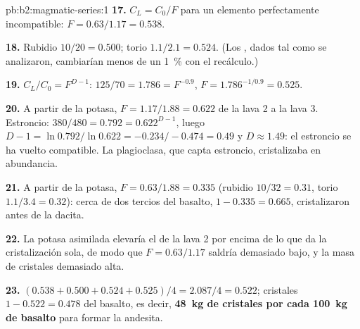 \begin{solution}{pb:b2:magmatic-series:1}
\textbf{17.} $C_L = C_0/F$ para un elemento perfectamente incompatible: $F = 0.63/1.17 =
0.538$.

\textbf{18.} Rubidio $10/20 = 0.500$; torio $1.1/2.1 = 0.524$. (Los ,
dados tal como se analizaron, cambiarían menos de un \qty{1}{\percent} con el
recálculo.)

\textbf{19.} $C_L/C_0 = F^{D - 1}$: $125/70 = 1.786 = F^{-0.9}$, $F = 1.786^{-1/0.9} =
0.525$.

\textbf{20.} A partir de la potasa, $F = 1.17/1.88 = 0.622$ de la lava 2 a la lava 3. Estroncio:
$380/480 = 0.792 = 0.622^{D - 1}$, luego $D - 1 = \ln 0.792/\ln 0.622 = -0.234/-0.474 =
0.49$ y $D \approx 1.49$: el estroncio se ha vuelto compatible. La plagioclasa, que capta
estroncio, cristalizaba en abundancia.

\textbf{21.} A partir de la potasa, $F = 0.63/1.88 = 0.335$ (rubidio $10/32 = 0.31$, torio
$1.1/3.4 = 0.32$): cerca de dos tercios del basalto, $1 - 0.335 = 0.665$, cristalizaron
antes de la dacita.

\textbf{22.} La potasa asimilada elevaría el  de la lava 2 por encima de lo que da
la cristalización sola, de modo que $F = 0.63/1.17$ saldría demasiado bajo, y la masa de
cristales demasiado alta.

\textbf{23.} $(0.538 + 0.500 + 0.524 + 0.525)/4 = 2.087/4 = 0.522$; cristales $1 - 0.522
= 0.478$ del basalto, es decir, \textbf{\qty[text-series-to-math=true]{48}{kg} de
cristales por cada \qty{100}{kg} de basalto} para formar la andesita.
\end{solution}
